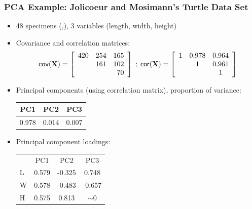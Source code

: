 \documentclass{beamer}
\begin{document}
\begin{frame}
  \frametitle{PCA Example: Jolicoeur and Mosimann's Turtle Data Set}

\begin{itemize}
\item 48 specimens (\Male,\Female), 3 variables (length, width, height)

\item Covariance and correlation matrices:
\footnotesize{
\[
\mathsf{cov}(\mathbf{X}) = \left[ \begin{array}{rrr}
420 & 254 & 165 \\
       & 161 & 102 \\
       &        &   70\\
\end{array}
\right]
\;
;
\;
\mathsf{cor}(\mathbf{X}) = \left[ \begin{array}{ccc}
1 & 0.978 & 0.964 \\
       & 1 & 0.961\\
       &        &   1\\
\end{array}
\right]
\]
} %

\item Principal components (using correlation matrix), proportion of variance:

{\small
\begin{center}
\begin{tabular}{ccc}
PC1 & PC2 & PC3 \\ \hline
0.978 & 0.014 & 0.007
\end{tabular}
\end{center}
} %

\item Principal component loadings:

{\small
\begin{center}
\begin{tabular}{lccc}
&PC1 & PC2 & PC3 \\ \cline{2-4}
L & 0.579 & -0.325 & 0.748 \\
W & 0.578 & -0.483 & -0.657 \\
H & 0.575 & 0.813 & $\sim$0 \\
\end{tabular}
\end{center}
} %



\end{itemize}


\end{frame}
\end{document}
